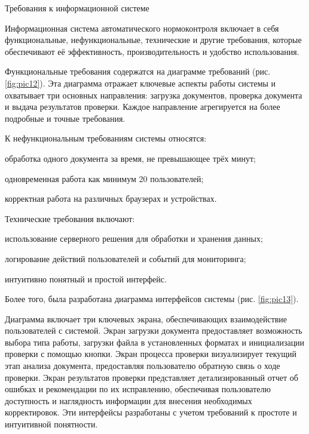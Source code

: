 \documentclass{report}
\begin{document}
Требования к информационной системе

Информационная система автоматического нормоконтроля включает в себя функциональные, нефункциональные, технические и другие требования, которые обеспечивают её эффективность, производительность и удобство использования.

Функциональные требования содержатся на диаграмме \break требований
(рис. \ref{fig:pic12}). Эта диаграмма отражает ключевые аспекты работы системы и охватывает три основных направления: загрузка документов, проверка документа и выдача результатов проверки. Каждое направление агрегируется на более подробные и точные требования.






К нефункциональным требованиям системы относятся:
\begin{enummarker}
\item обработка одного документа за время, не превышающее трёх минут;
\item одновременная работа как минимум 20 пользователей;
\item корректная работа на различных браузерах и устройствах.
\end{enummarker}

\break

Технические требования включают:
\begin{enummarker}
\item использование серверного решения для обработки и хранения данных; %
\item логирование действий пользователей и событий для мониторинга; %
\item интуитивно понятный и простой интерфейс.
\end{enummarker}






Более того, была разработана диаграмма интерфейсов системы (рис. \ref{fig:pic13}). 


Диаграмма включает три ключевых экрана, обеспечивающих взаимодействие пользователей с системой. Экран загрузки документа предоставляет возможность выбора типа работы, загрузки файла в установленных форматах и инициализации проверки с помощью кнопки. Экран процесса проверки визуализирует текущий этап анализа документа, предоставляя пользователю обратную связь о ходе проверки. Экран результатов проверки представляет детализированный отчет об ошибках и рекомендации по их исправлению, обеспечивая пользователю доступность и наглядность информации для внесения необходимых корректировок. Эти интерфейсы разработаны с учетом требований к простоте и интуитивной понятности.
\end{document}
